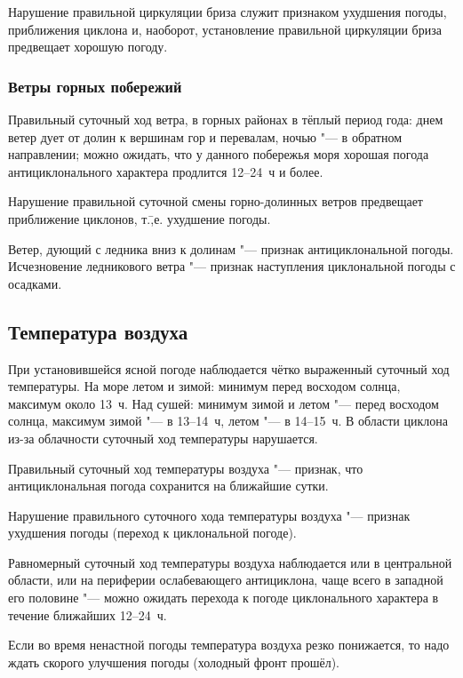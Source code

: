  Нарушение правильной циркуляции бриза служит признаком
ухудшения погоды, приближения циклона и, наоборот, установление
правильной циркуляции бриза предвещает хорошую погоду.

\subsubsection{Ветры горных побережий}

 Правильный суточный ход ветра, в горных районах в тёплый
период года: днем ветер дует от долин к вершинам гор и перевалам,
ночью "--- в обратном направлении; можно ожидать, что у данного побережья
моря хорошая погода антициклонального характера продлится 12--24~ч и
более.

 Нарушение правильной суточной смены горно-долинных ветров
предвещает приближение циклонов, т.\=,е. ухудшение погоды.

 Ветер, дующий с ледника вниз к долинам "--- признак антициклональной
погоды. Исчезновение ледникового ветра "--- признак наступления
циклональной погоды с осадками.

\subsection{Температура воздуха}

При установившейся ясной погоде наблюдается чётко выраженный суточный
ход температуры. На море летом и зимой: минимум перед восходом солнца,
максимум около 13~ч. Над сушей: минимум зимой и летом "--- перед восходом
солнца, максимум зимой "--- в 13--14~ч, летом "--- в 14--15~ч. В области
циклона из-за облачности суточный ход температуры нарушается.

 Правильный суточный ход температуры воздуха "--- признак, что
антициклональная погода сохранится на ближайшие сутки.

 Нарушение правильного суточного хода температуры воздуха "---
признак ухудшения погоды (переход к циклональной погоде).

 Равномерный суточный ход температуры воздуха наблюдается или в
центральной области, или на периферии ослабевающего антициклона, чаще
всего в западной его половине "--- можно ожидать перехода к погоде
циклонального характера в течение ближайших 12--24~ч.

 Если во время ненастной погоды температура воздуха резко
понижается, то надо ждать скорого улучшения погоды (холодный фронт
прошёл).

